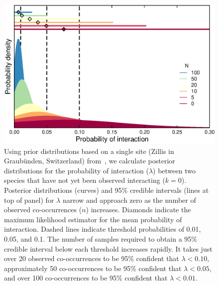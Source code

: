 \documentclass[12pt]{article}
\begin{document}
  \begin{figure}[h!]
    \caption{Using prior distributions based on a single site (Zillis in Graub\"{u}nden, Switzerland) from~\citet{Kopelke2017}, we calculate posterior distributions for the probability of interaction ($\lambda$) between two species that have not yet been observed interacting ($k = 0$). 
    Posterior distributions (curves) and 95\% credible intervals (lines at top of panel) for $\lambda$ narrow and approach zero as the number of observed co-occurrences ($n$) increases. Diamonds indicate the maximum likelihood estimator for the mean probability of interaction.
    Dashed lines indicate threshold probabilities of 0.01, 0.05, and 0.1. The number of samples required to obtain a 95\% credible interval below each threshold increases rapidly. It takes just over 20 observed co-occurrences to be 95\% confident that $\lambda<0.10$, approximately 50 co-occurrences to be 95\% confident that $\lambda<0.05$, and over 100 co-occurrences to be 95\% confident that $\lambda<0.01$.}
    \label{Salix_pdfs_cdfs}
    \begin{center}
    \includegraphics*[width=.8\textwidth]{figures/GP_pdfs_increasing_N_Zillis.eps}
    \end{center}
    \end{figure}
\end{document}
